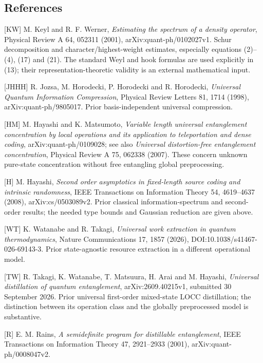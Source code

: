 \documentclass[11pt]{article}
\begin{document}
\hypertarget{references}{%
\subsection{References}\label{references}}

{[}KW{]} M. Keyl and R. F. Werner, \emph{Estimating the spectrum of a density operator}, Physical Review A 64, 052311 (2001), arXiv:quant-ph/0102027v1. Schur decomposition and character/highest-weight estimates, especially equations (2)--(4), (17) and (21). The standard Weyl and hook formulas are used explicitly in (13); their representation-theoretic validity is an external mathematical input.

{[}JHHH{]} R. Jozsa, M. Horodecki, P. Horodecki and R. Horodecki, \emph{Universal Quantum Information Compression}, Physical Review Letters 81, 1714 (1998), arXiv:quant-ph/9805017. Prior basis-independent universal compression.

{[}HM{]} M. Hayashi and K. Matsumoto, \emph{Variable length universal entanglement concentration by local operations and its application to teleportation and dense coding}, arXiv:quant-ph/0109028; see also \emph{Universal distortion-free entanglement concentration}, Physical Review A 75, 062338 (2007). These concern unknown pure-state concentration without free entangling global preprocessing.

{[}H{]} M. Hayashi, \emph{Second order asymptotics in fixed-length source coding and intrinsic randomness}, IEEE Transactions on Information Theory 54, 4619--4637 (2008), arXiv:cs/0503089v2. Prior classical information-spectrum and second-order results; the needed type bounds and Gaussian reduction are given above.

{[}WT{]} K. Watanabe and R. Takagi, \emph{Universal work extraction in quantum thermodynamics}, Nature Communications 17, 1857 (2026), DOI:10.1038/s41467-026-69143-3. Prior state-agnostic resource extraction in a different operational model.

{[}TW{]} R. Takagi, K. Watanabe, T. Matsuura, H. Arai and M. Hayashi, \emph{Universal distillation of quantum entanglement}, arXiv:2609.40215v1, submitted 30 September 2026. Prior universal first-order mixed-state LOCC distillation; the distinction between its operation class and the globally preprocessed model is substantive.

{[}R{]} E. M. Rains, \emph{A semidefinite program for distillable entanglement}, IEEE Transactions on Information Theory 47, 2921--2933 (2001), arXiv:quant-ph/0008047v2.
\end{document}
